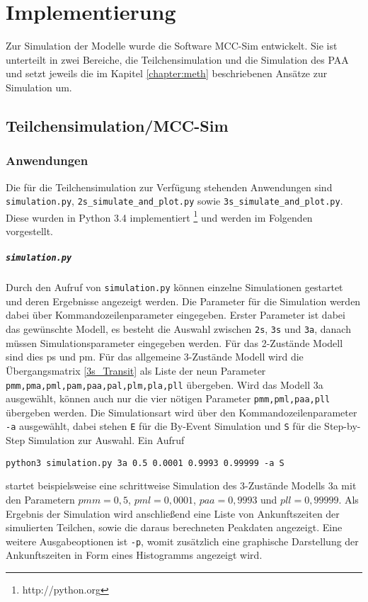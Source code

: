 \chapter{Implementierung}
\label{chapter:imp}

Zur Simulation der Modelle wurde die Software MCC-Sim entwickelt. 
Sie ist unterteilt in zwei Bereiche, die Teilchensimulation und die Simulation des PAA und setzt jeweils die im Kapitel \ref{chapter:meth} beschriebenen Ansätze zur Simulation um.
% 
% 


\section{Teilchensimulation/MCC-Sim}


\subsection{Anwendungen}
Die für die Teilchensimulation zur Verfügung stehenden Anwendungen sind \texttt{simulation.py}, \verb!2s_simulate_and_plot.py! sowie  \verb!3s_simulate_and_plot.py!. Diese wurden in Python 3.4 implementiert \footnote{http://python.org} und werden im Folgenden vorgestellt.

\paragraph{\texttt{simulation.py}}

Durch den Aufruf von \texttt{simulation.py} können einzelne Simulationen gestartet und deren Ergebnisse angezeigt werden.
Die Parameter für die Simulation werden dabei über Kommandozeilenparameter eingegeben. Erster Parameter ist dabei das gewünschte Modell, es besteht die Auswahl zwischen \texttt{2s}, \texttt{3s} und \texttt{3a}, danach müssen Simulationsparameter eingegeben werden. Für das 2-Zustände Modell sind dies ps und pm. Für das allgemeine 3-Zustände Modell wird die Übergangsmatrix \ref{3s_Transit} als Liste der neun Parameter \verb!pmm,pma,pml,pam,paa,pal,plm,pla,pll! übergeben. Wird das Modell 3a ausgewählt, können auch nur die vier nötigen Parameter \verb!pmm,pml,paa,pll! übergeben werden.
Die Simulationsart wird über den Kommandozeilenparameter \texttt{-a} ausgewählt, dabei stehen \texttt{E} für die By-Event Simulation und \texttt{S} für die Step-by-Step Simulation zur Auswahl.
Ein Aufruf
\begin{verbatim}
python3 simulation.py 3a 0.5 0.0001 0.9993 0.99999 -a S
\end{verbatim}
startet beispielsweise eine schrittweise Simulation des 3-Zustände Modells 3a mit den Parametern $pmm = 0,5$, $pml = 0,0001$, $paa = 0,9993$ und $pll = 0,99999$. Als Ergebnis der Simulation wird anschließend eine Liste von Ankunftszeiten der simulierten Teilchen, sowie die daraus berechneten Peakdaten angezeigt. Eine weitere Ausgabeoptionen ist \texttt{-p}, womit zusätzlich eine graphische Darstellung der Ankunftszeiten in Form eines Histogramms angezeigt wird.

